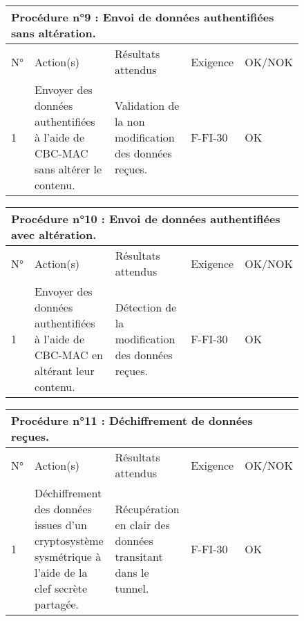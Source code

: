 \documentclass[a4paper,11pt,french]{article}
\begin{document}
\begin{figure}[!h]
\begin{tabular}{|p{1cm}|p{5cm}|p{5cm}|p{2cm}|p{2cm}|}
\hline
\multicolumn{5}{|l|}{Procédure n°9 : Envoi de données authentifiées sans altération.} \\
\hline
N° & Action(s) & Résultats attendus & Exigence & OK/NOK \\
\hline
1 & Envoyer des données authentifiées à l'aide de CBC-MAC sans altérer le contenu. & Validation de la non modification des données reçues. & F-FI-30 & OK \\
\hline
\end{tabular}
\end{figure}


\begin{figure}[!h]
\begin{tabular}{|p{1cm}|p{5cm}|p{5cm}|p{2cm}|p{2cm}|}
\hline
\multicolumn{5}{|l|}{Procédure n°10 : Envoi de données authentifiées avec altération.} \\
\hline
N° & Action(s) & Résultats attendus & Exigence & OK/NOK \\
\hline
1 & Envoyer des données authentifiées à l'aide de CBC-MAC en altérant leur contenu. & Détection de la modification des données reçues. & F-FI-30
 & OK \\
\hline
\end{tabular}
\end{figure}


\begin{figure}[!h]
\begin{tabular}{|p{1cm}|p{5cm}|p{5cm}|p{2cm}|p{2cm}|}
\hline
\multicolumn{5}{|l|}{Procédure n°11 : Déchiffrement de données reçues.} \\
\hline
N° & Action(s) & Résultats attendus & Exigence & OK/NOK \\
\hline
1 & Déchiffrement des données issues d'un cryptosystème sysmétrique à l'aide de la clef secrète partagée. & Récupération en clair des données transitant dans le tunnel. & F-FI-30 & OK \\
\hline
\end{tabular}
\end{figure}


\newpage
\end{document}

